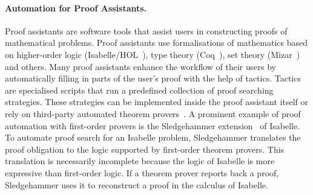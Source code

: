 \paragraph{Automation for Proof Assistants.}
Proof assistants are software tools that assist users in constructing proofs of mathematical problems. Proof assistants use formalisations of mathematics based on higher-order logic (Isabelle/HOL~\cite{Isabelle}), type theory (Coq~\cite{Coq}), set theory (Mizar~\cite{Mizar}) and others. Many proof assistants enhance the workflow of their users by automatically filling in parts of the user's proof with the help of tactics. Tactics are specialised scripts that run a predefined collection of proof searching strategies. These strategies can be implemented inside the proof assistant itself or rely on third-party automated theorem provers~\cite{Sledgehammer,DBLP:conf/icms/UrbanHV10}. A prominent example of proof automation with first-order provers is the Sledgehammer extension~\cite{Sledgehammer} of Isabelle. To automate proof search for an Isabelle problem, Sledgehammer translates the proof obligation to the logic supported by first-order theorem provers. This translation is necessarily incomplete because the logic of Isabelle is more expressive than first-order logic. If a theorem prover reports back a proof, Sledgehammer uses it to reconstruct a proof in the calculus of Isabelle.

